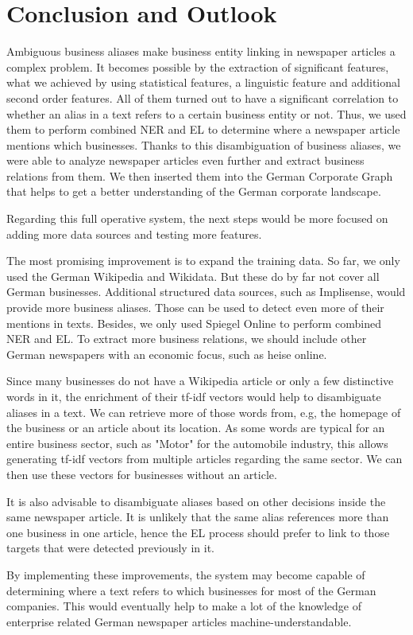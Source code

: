 \section{Conclusion and Outlook}
\label{sec:conclusion}
Ambiguous business aliases make business entity linking in newspaper articles a complex problem. It becomes possible by the extraction of significant features, what we achieved by using statistical features, a linguistic feature and additional second order features. All of them turned out to have a significant correlation to whether an alias in a text refers to a certain business entity or not. Thus, we used them to perform combined NER and EL to determine where a newspaper article mentions which businesses. Thanks to this disambiguation of business aliases, we were able to analyze newspaper articles even further and extract business relations from them. We then inserted them into the German Corporate Graph that helps to get a better understanding of the German corporate landscape.

Regarding this full operative system, the next steps would be more focused on adding more data sources and testing more features.

The most promising improvement is to expand the training data. So far, we only used the German Wikipedia and Wikidata. But these do by far not cover all German businesses. Additional structured data sources, such as Implisense, would provide more business aliases. Those can be used to detect even more of their mentions in texts. Besides, we only used Spiegel Online to perform combined NER and EL. To extract more business relations, we should include other German newspapers with an economic focus, such as heise online\footnotemark{}.

Since many businesses do not have a Wikipedia article or only a few distinctive words in it, the enrichment of their tf-idf vectors would help to disambiguate aliases in a text. We can retrieve more of those words from, e.g, the homepage of the business or an article about its location. As some words are typical for an entire business sector, such as "Motor" for the automobile industry, this allows generating tf-idf vectors from multiple articles regarding the same sector. We can then use these vectors for businesses without an article.

It is also advisable to disambiguate aliases based on other decisions inside the same newspaper article. It is unlikely that the same alias references more than one business in one article, hence the EL process should prefer to link to those targets that were detected previously in it.

By implementing these improvements, the system may become capable of determining where a text refers to which businesses for most of the German companies. This would eventually help to make a lot of the knowledge of enterprise related German newspaper articles machine-understandable.